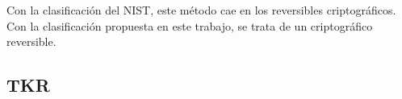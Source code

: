 
Con la clasificación del NIST, este método cae en los reversibles
criptográficos. Con la clasificación propuesta en este trabajo, se trata de un
criptográfico reversible.

\subsection{TKR}

%
